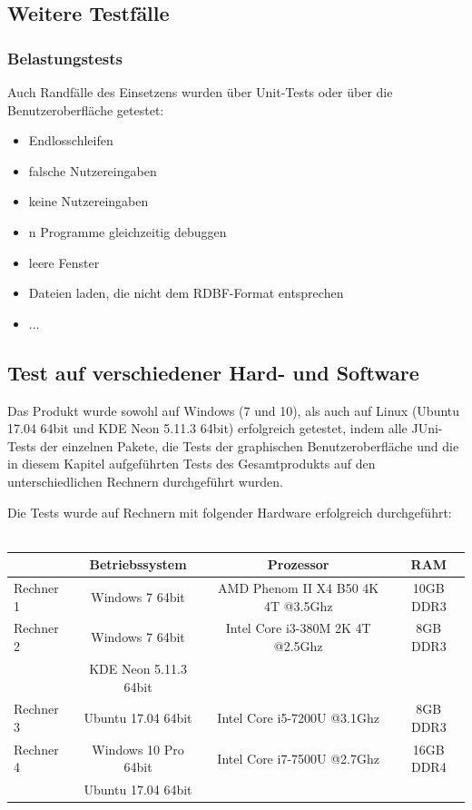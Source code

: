 \documentclass[parskip=full]{scrartcl}
\begin{document}
\subsection{Weitere Testfälle}

\subsubsection{Belastungstests} %
\label{stress}
Auch Randfälle des Einsetzens wurden über Unit-Tests oder über die Benutzeroberfläche getestet: 
\begin{itemize}
\item Endlosschleifen
\item falsche Nutzereingaben
\item keine Nutzereingaben
\item n Programme gleichzeitig debuggen
\item leere Fenster
\item Dateien laden, die nicht dem RDBF-Format entsprechen
\item ...

\end{itemize}

\subsection{Test auf verschiedener Hard- und Software}

Das Produkt wurde sowohl auf Windows (7 und 10), als auch auf Linux (Ubuntu 17.04 64bit und KDE Neon 5.11.3 64bit) erfolgreich getestet, indem alle JUni-Tests der einzelnen Pakete, die Tests der graphischen Benutzeroberfläche und die in diesem Kapitel aufgeführten Tests des Gesamtprodukts auf den unterschiedlichen Rechnern durchgeführt wurden.

Die Tests wurde auf Rechnern mit folgender Hardware erfolgreich durchgeführt: \\ \\
\begin{tabular}{l||c|c|c}
   	& Betriebssystem & Prozessor & RAM \\
	\hline
	\hline
	Rechner 1 & Windows 7 64bit & AMD Phenom II X4 B50 4K 4T @3.5Ghz & 10GB DDR3 \\
	Rechner 2 & Windows 7 64bit & Intel Core i3-380M 2K 4T @2.5Ghz & 8GB DDR3 \\
	 & KDE Neon 5.11.3 64bit &  \\
	Rechner 3 & Ubuntu 17.04 64bit & Intel Core i5-7200U @3.1Ghz & 8GB DDR3 \\
	Rechner 4 & Windows 10 Pro 64bit & Intel Core i7-7500U @2.7Ghz & 16GB DDR4\\
		& Ubuntu 17.04 64bit\\
\end{tabular}
\end{document}
